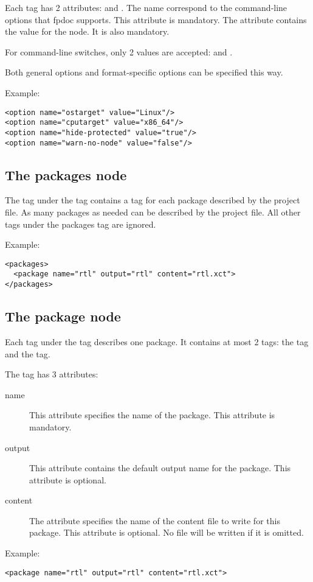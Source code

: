 Each  tag has 2 attributes:  and . 
The name correspond to the command-line options that fpdoc supports.
This attribute is mandatory. The  attribute contains the 
value for the node. It is also mandatory.

For command-line switches, only 2 values are accepted:  and
.  

Both general options and format-specific options can be specified this way.

Example:
\begin{verbatim}
<option name="ostarget" value="Linux"/>
<option name="cputarget" value="x86_64"/>
<option name="hide-protected" value="true"/>
<option name="warn-no-node" value="false"/>
\end{verbatim}

\subsection{The packages node}
\label{project:packages}
The  tag under the  tag contains a
 tag for each package described by the project file.
As many packages as needed can be described by the project file.
All other tags under the packages tag are ignored.

Example:
\begin{verbatim}
<packages>
  <package name="rtl" output="rtl" content="rtl.xct">
</packages>
\end{verbatim}

\subsection{The package node}
\label{project:package}
Each  tag under the  tag describes one package.
It contains at most 2 tags: the  tag and the  tag.

The  tag has 3 attributes:
\begin{description}
\item[name] This attribute specifies the name of the package. This attribute is mandatory.
\item[output] This attribute contains the default output name for the package. This attribute is
optional.
\item[content] The  attribute specifies the name of the content file to write 
for this package. This attribute is optional. No file will be written if it is omitted.
\end{description}
Example:
\begin{verbatim}
<package name="rtl" output="rtl" content="rtl.xct">
\end{verbatim}

